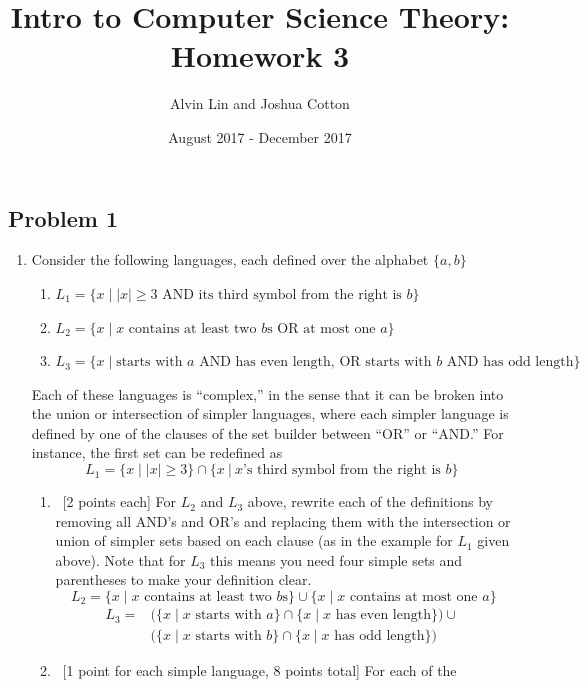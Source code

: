 \documentclass[letterpaper, 12pt]{math}
\title{Intro to Computer Science Theory: Homework 3}
\author{Alvin Lin and Joshua Cotton}
\date{August 2017 - December 2017}
\begin{document}
\maketitle

\subsection*{Problem 1}

\begin{enumerate}
  \item Consider the following languages, each defined over the alphabet
  \( \{a,b\} \)
  \begin{enumerate}
    \item \( L_1 = \{x\mid|x|\geq3\text{ AND its third symbol from the right
    is } b\} \)
    \item \( L_2 = \{x\mid x\text{ contains at least two } b\text{s OR at most
    one } a\} \)
    \item \( L_3=\{x\mid\text{starts with }a\text{ AND has even length, OR
    starts with } b \text{ AND has odd length}\} \)
  \end{enumerate}
  Each of these languages is ``complex,'' in the sense that it can be broken
  into the union or intersection of simpler languages, where each simpler
  language is defined by one of the clauses of the set builder between ``OR''
  or ``AND.'' For instance, the first set can be redefined as
  \[ L_1 = \{x\mid|x|\geq 3\} \cap \{x~|~x\mbox{'s third symbol from the right
    is } b\} \]
  \begin{enumerate}
    \item ~[2 points each] For \( L_2 \) and \( L_3 \) above, rewrite each of
    the definitions by removing all AND's and OR's and replacing them with the
    intersection or union of simpler sets based on each clause (as in the
    example for \( L_1 \) given above). Note that for \( L_3 \) this means you
    need four simple sets and parentheses to make your definition clear.
    \[ L_2 = \{x\mid x\text{ contains at least two } b\text{s}\} \cup \{x\mid
      x\text{ contains at most one } a\} \]
    \begin{align*}
      L_3 =& \bigg(\{x\mid x\text{ starts with } a\}\cap\{x\mid x\text{ has even
        length}\}\bigg)\cup\ \\
      & \bigg(\{x\mid x\text{ starts with } b\}\cap
        \{x\mid x\text{ has odd length}\}\bigg)
    \end{align*}
    \item ~[1 point for each simple language, 8 points total] For each of the

\end{enumerate}
\end{enumerate}
\end{document}
